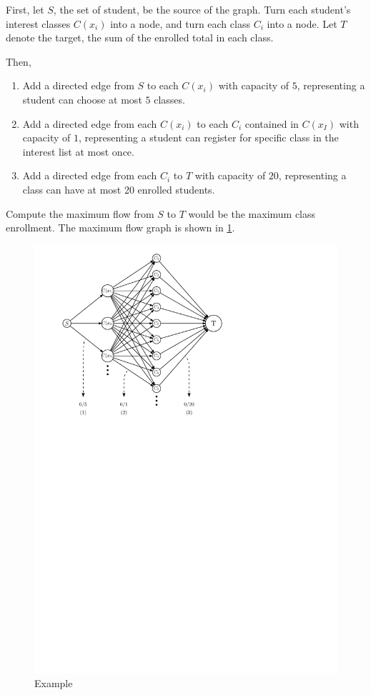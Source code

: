 \documentclass[12pt,letterpaper,titlepage,en-US]{article}
\begin{document}
\begin{homeworkProblem}
    \begin{homeworkSubProblem}
First, let $S$, the set of student, be the source of the graph.
Turn each student's interest classes $C(x_i)$ into a node,
and turn each class $C_i$ into a node.
Let $T$ denote the target, the sum of the enrolled total in each class.

Then,
\begin{enumerate}[label={(\arabic*)},leftmargin=.5in]
    \item Add a directed edge from $S$ to each $C(x_i)$ with capacity of $5$,
        representing a student can choose at most $5$ classes.
    \item Add a directed edge from each $C(x_i)$ to each $C_i$ contained in $C(x_I)$ with capacity of $1$,
        representing a student can register for specific class in the interest list at most once.
    \item Add a directed edge from each $C_i$ to $T$ with capacity of $20$,
        representing a class can have at most 20 enrolled students.
\end{enumerate}

Compute the maximum flow from $S$ to $T$ would be the maximum class enrollment.
The maximum flow graph is shown in \cref{p4a}.

\begin{figure}[H]
    \caption{Example}\label{p4a}
    \centering
    \includegraphics[width=.6\textwidth]{p4a}
\end{figure}



\end{homeworkSubProblem}
\end{homeworkProblem}
\end{document}
